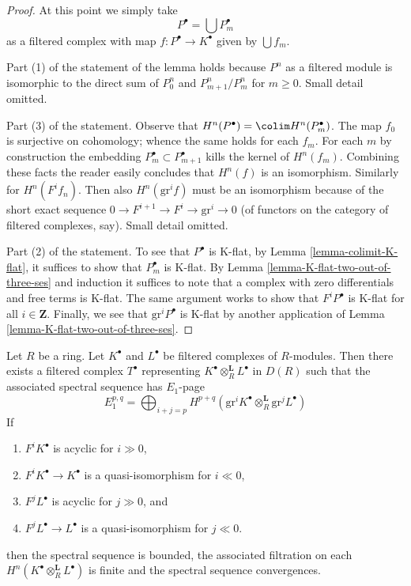 \begin{proof}
\medskip\noindent
At this point we simply take
$$
P^\bullet = \bigcup P_m^\bullet
$$
as a filtered complex with map $f : P^\bullet \to K^\bullet$
given by $\bigcup f_m$.

\medskip\noindent
Part (1) of the statement of the lemma holds because $P^n$
as a filtered module is isomorphic to the direct sum of
$P_0^n$ and $P_{m + 1}^n/P_m^n$ for $m \geq 0$. Small detail omitted.

\medskip\noindent
Part (3) of the statement. Observe that
$H^n(P^\bullet) = \colim H^n(P_m^\bullet)$.
The map $f_0$ is surjective on cohomology; whence the same holds
for each $f_m$. For each $m$ by construction the embedding
$P_m^\bullet \subset P_{m + 1}^\bullet$
kills the kernel of $H^n(f_m)$. Combining these facts the
reader easily concludes that $H^n(f)$ is an isomorphism.
Similarly for $H^n(F^if_n)$. Then also $H^n(\text{gr}^if)$
must be an isomorphism because of the short exact sequence
$0 \to F^{i + 1} \to F^i \to \text{gr}^i \to 0$ (of functors
on the category of filtered complexes, say).
Small detail omitted.

\medskip\noindent
Part (2) of the statement. To see that $P^\bullet$ is K-flat, by
Lemma \ref{lemma-colimit-K-flat}, it suffices to show that $P_m^\bullet$
is K-flat. By Lemma \ref{lemma-K-flat-two-out-of-three-ses}
and induction it suffices to note that a complex with zero differentials
and free terms is K-flat. The same argument works to
show that $F^iP^\bullet$ is K-flat for all $i \in \mathbf{Z}$.
Finally, we see that $\text{gr}^iP^\bullet$ is K-flat by
another application of Lemma \ref{lemma-K-flat-two-out-of-three-ses}.
\end{proof}

\begin{proposition}
\label{proposition-kunneth-filtered}
Let $R$ be a ring. Let $K^\bullet$ and $L^\bullet$ be filtered complexes
of $R$-modules. Then there exists a filtered complex $T^\bullet$
representing $K^\bullet \otimes_R^\mathbf{L} L^\bullet$ in $D(R)$
such that the associated spectral sequence has $E_1$-page
$$
E_1^{p, q} =
\bigoplus\nolimits_{i + j = p}
H^{p + q}(\text{gr}^iK^\bullet \otimes_R^\mathbf{L} \text{gr}^jL^\bullet)
$$
If
\begin{enumerate}
\item $F^iK^\bullet$ is acyclic for $i \gg 0$,
\item $F^iK^\bullet \to K^\bullet$ is a quasi-isomorphism for $i \ll 0$,
\item $F^jL^\bullet$ is acyclic for $j \gg 0$, and
\item $F^jL^\bullet \to L^\bullet$ is a quasi-isomorphism for $j \ll 0$.
\end{enumerate}
then the spectral sequence is bounded, the associated filtration on each
$H^n(K^\bullet \otimes_R^\mathbf{L} L^\bullet)$ is finite
and the spectral sequence convergences.
\end{proposition}

